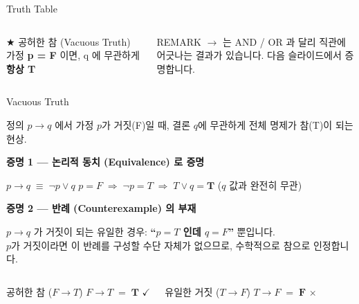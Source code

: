 \documentclass[10.5pt,compress]{beamer}
\begin{document}
\begin{frame}[t]{Truth Table}
\begin{columns}[T]
        \vspace{0.15cm}
        \begin{block}{\scriptsize $\bigstar$ 공허한 참 (Vacuous Truth)}
            \footnotesize 가정 \textbf{p = F} 이면, q 에 무관하게 \textbf{항상 T}
        \end{block}

        \vspace{0.06cm}
        \begin{alertblock}{\scriptsize REMARK}
            \scriptsize $\rightarrow$ 는 AND / OR 과 달리 직관에 어긋나는 결과가 있습니다. 다음 슬라이드에서 증명합니다.
        \end{alertblock}
    \end{columns}
\end{frame}

\begin{frame}[t]{Vacuous Truth}
    \footnotesize
    \begin{block}{정의}
        $p \rightarrow q$ 에서 가정 $p$가 거짓(F)일 때, 결론 $q$에 무관하게 전체 명제가 참(T)이 되는 현상.
    \end{block}

    \vspace{0.08cm}
    \textbf{증명 1 — 논리적 동치 (Equivalence) 로 증명}
    \begin{exampleblock}{}
        \scriptsize
        $p \rightarrow q \;\equiv\; \neg p \lor q$
        \qquad
        $p = F \;\Rightarrow\; \neg p = T \;\Rightarrow\; T \lor q = \mathbf{T}$ \quad ($q$ 값과 완전히 무관)
    \end{exampleblock}

    \vspace{0.1cm}
    \textbf{증명 2 — 반례 (Counterexample) 의 부재}
    \begin{block}{}
        \scriptsize
        $p \rightarrow q$ 가 거짓이 되는 유일한 경우: \textbf{``$p = T$ 인데 $q = F$''} 뿐입니다.\\
        $p$가 거짓이라면 이 반례를 구성할 수단 자체가 없으므로, 수학적으로 참으로 인정합니다.
    \end{block}

    \vspace{0.1cm}
    \begin{columns}[T]
        \begin{exampleblock}{공허한 참 ($F \rightarrow T$)}
            \centering $F \rightarrow T \;=\; \mathbf{T}$ \; $\checkmark$
        \end{exampleblock}
        \begin{alertblock}{유일한 거짓 ($T \rightarrow F$)}
            \centering $T \rightarrow F \;=\; \mathbf{F}$ \; $\times$
        \end{alertblock}
    \end{columns}
\end{frame}
\end{document}
